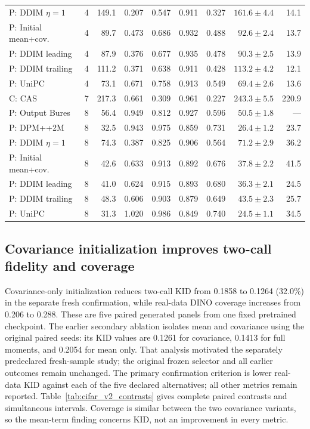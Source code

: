 \begin{table}[t]
\begin{tabular}{llrrrrrrr}
P: DDIM $\eta=1$ & 4 & 149.1 & 0.207 & 0.547 & 0.911 & 0.327 & $161.6\pm4.4$ & 14.1 \\
P: Initial mean+cov. & 4 & 89.7 & 0.473 & 0.686 & 0.932 & 0.488 & $92.6\pm2.4$ & 13.7 \\
P: DDIM leading & 4 & 87.9 & 0.376 & 0.677 & 0.935 & 0.478 & $90.3\pm2.5$ & 13.9 \\
P: DDIM trailing & 4 & 111.2 & 0.371 & 0.638 & 0.911 & 0.428 & $113.2\pm4.2$ & 12.1 \\
P: UniPC & 4 & 73.1 & 0.671 & 0.758 & 0.913 & 0.549 & $69.4\pm2.6$ & 13.6 \\
C: CAS & 7 & 217.3 & 0.661 & 0.309 & 0.961 & 0.227 & $243.3\pm5.5$ & 220.9 \\
P: Output Bures & 8 & 56.4 & 0.949 & 0.812 & 0.927 & 0.596 & $50.5\pm1.8$ & --- \\
P: DPM++2M & 8 & 32.5 & 0.943 & 0.975 & 0.859 & 0.731 & $26.4\pm1.2$ & 23.7 \\
P: DDIM $\eta=1$ & 8 & 74.3 & 0.387 & 0.825 & 0.906 & 0.564 & $71.2\pm2.9$ & 36.2 \\
P: Initial mean+cov. & 8 & 42.6 & 0.633 & 0.913 & 0.892 & 0.676 & $37.8\pm2.2$ & 41.5 \\
P: DDIM leading & 8 & 41.0 & 0.624 & 0.915 & 0.893 & 0.680 & $36.3\pm2.1$ & 24.5 \\
P: DDIM trailing & 8 & 48.3 & 0.606 & 0.903 & 0.879 & 0.649 & $43.5\pm2.3$ & 25.7 \\
P: UniPC & 8 & 31.3 & 1.020 & 0.986 & 0.849 & 0.740 & $24.5\pm1.1$ & 34.5 \\
\bottomrule
\end{tabular}
\end{table}

\subsection{Covariance initialization improves two-call fidelity and coverage}
\label{supp:cifar_initializer}
Covariance-only initialization reduces two-call KID from 0.1858 to 0.1264
(32.0\%) in the separate fresh confirmation, while real-data DINO coverage
increases from 0.206 to 0.288. These are five paired generated panels from
one fixed pretrained checkpoint. The earlier secondary ablation isolates
mean and covariance using the original paired seeds: its KID values are
0.1261 for covariance, 0.1413 for full moments, and 0.2054 for mean only.
That analysis motivated the separately predeclared fresh-sample study;
the original frozen selector and all earlier outcomes remain unchanged. The primary confirmation
criterion is lower real-data KID against each of the five declared alternatives;
all other metrics remain reported. Table~\ref{tab:cifar_v2_contrasts} gives
complete paired contrasts and simultaneous intervals. Coverage is similar
between the two covariance variants, so the mean-term finding concerns KID,
not an improvement in every metric.

